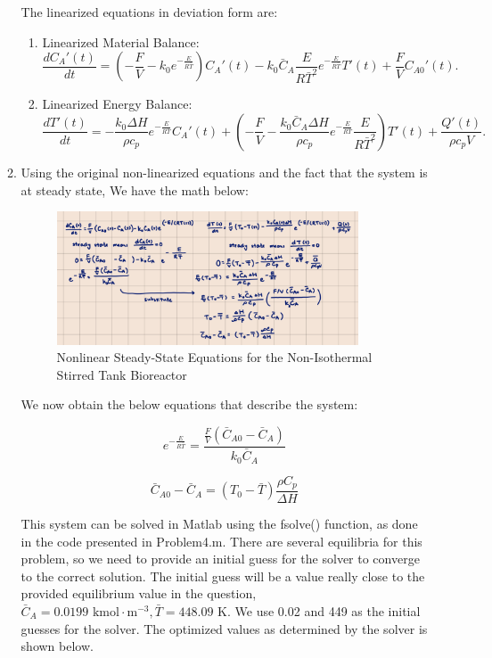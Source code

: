 \documentclass[12pt]{article}
\begin{document}
\begin{enumerate}
\begin{enumerate}
    The linearized equations in deviation form are:
    \begin{enumerate}
      \item Linearized Material Balance:
        \[
        \frac{dC_A'(t)}{dt} = \left( - \frac{F}{V} - k_0 e^{-\frac{E}{R\bar{T}}} \right) C_A'(t) - k_0 \bar{C}_A \frac{E}{R\bar{T}^2} e^{-\frac{E}{R\bar{T}}} T'(t) + \frac{F}{V} C_{A0}'(t).
        \]
      \item Linearized Energy Balance:
        \[  
        \frac{dT'(t)}{dt} = - \frac{k_0 \Delta H}{\rho c_p} e^{-\frac{E}{R\bar{T}}} C_A'(t) + \left( -\frac{F}{V} - \frac{k_0 \bar{C}_A \Delta H}{\rho c_p} e^{-\frac{E}{R\bar{T}}} \frac{E}{R\bar{T}^2} \right) T'(t) + \frac{Q'(t)}{\rho c_p V}.
        \]
    \end{enumerate}    

    \item
    Using the original non-linearized equations and the fact that the system is at steady state, We have the math below:

    \begin{figure}[H]
      \centering
      \includegraphics[width=0.9\textwidth]{Figures/handcalc/figure4-2.png}
      \caption{Nonlinear Steady-State Equations for the Non-Isothermal Stirred Tank Bioreactor}
      \label{fig:figure42}
    \end{figure}

    We now obtain the below equations that describe the system:

    \[
    e^{-\frac{E}{R\bar{T}}} = \frac{\frac{F}{V} (\bar{C}_{A0} - \bar{C}_A)}{k_0 \bar{C}_A}
    \]

    \[
    \bar{C}_{A0} - \bar{C}_A = (T_0 - \bar{T}) \frac{\rho C_p}{\Delta H}
    \]

    This system can be solved in Matlab using the fsolve() function, as done in the code presented in Problem4.m. There are several equilibria for this problem, so we need to provide an initial guess for the solver to converge to the correct solution. The initial guess will be a value really close to the provided equilibrium value in the question, $\bar{C}_A = 0.0199 \text{ kmol} \cdot \text{m}^{-3}, \bar{T} = 448.09 \text{ K}$. We use 0.02 and 449 as the initial guesses for the solver. The optimized values as determined by the solver is shown below.


\end{enumerate}
\end{enumerate}
\end{document}
